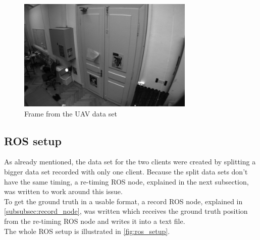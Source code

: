 \begin{figure}[H]
  \centering
  \includegraphics[width=0.75\textwidth]{images/frame0128}
  \caption{Frame from the \ac{UAV} data set}
  \label{fig:dataset_uav}
\end{figure}

\subsection{\acf{ROS} setup}
As already mentioned, the data set for the two clients were created by splitting a bigger data set recorded with only one client. Because the split data sets don't have the same timing, a re-timing \ac{ROS} node, explained in the next subsection, was written to work around this issue.\\
To get the ground truth in a usable format, a record \ac{ROS} node, explained in \autoref{subsubsec:record_node}, was written which receives the ground truth position from the re-timing \ac{ROS} node and writes it into a text file.\\

The whole \ac{ROS} setup is illustrated in \autoref{fig:ros_setup}.

